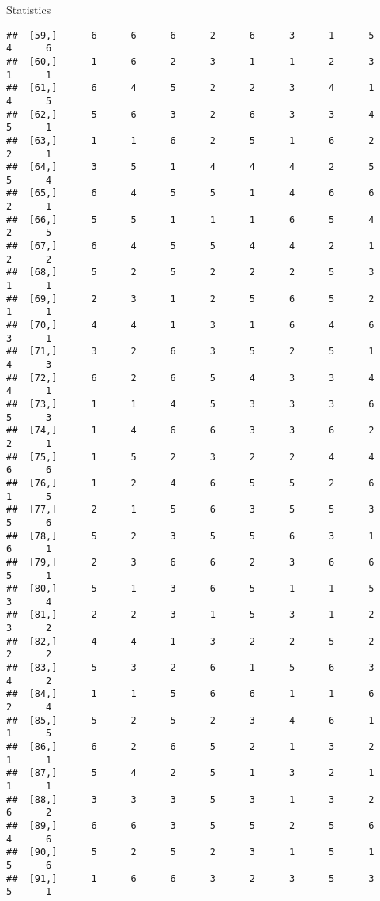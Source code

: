 \documentclass[
  ignorenonframetext,
]{beamer}
\begin{document}
\begin{frame}[fragile]{Statistics}
\begin{verbatim}
##  [59,]      6      6      6      2      6      3      1      5      4      6
##  [60,]      1      6      2      3      1      1      2      3      1      1
##  [61,]      6      4      5      2      2      3      4      1      4      5
##  [62,]      5      6      3      2      6      3      3      4      5      1
##  [63,]      1      1      6      2      5      1      6      2      2      1
##  [64,]      3      5      1      4      4      4      2      5      5      4
##  [65,]      6      4      5      5      1      4      6      6      2      1
##  [66,]      5      5      1      1      1      6      5      4      2      5
##  [67,]      6      4      5      5      4      4      2      1      2      2
##  [68,]      5      2      5      2      2      2      5      3      1      1
##  [69,]      2      3      1      2      5      6      5      2      1      1
##  [70,]      4      4      1      3      1      6      4      6      3      1
##  [71,]      3      2      6      3      5      2      5      1      4      3
##  [72,]      6      2      6      5      4      3      3      4      4      1
##  [73,]      1      1      4      5      3      3      3      6      5      3
##  [74,]      1      4      6      6      3      3      6      2      2      1
##  [75,]      1      5      2      3      2      2      4      4      6      6
##  [76,]      1      2      4      6      5      5      2      6      1      5
##  [77,]      2      1      5      6      3      5      5      3      5      6
##  [78,]      5      2      3      5      5      6      3      1      6      1
##  [79,]      2      3      6      6      2      3      6      6      5      1
##  [80,]      5      1      3      6      5      1      1      5      3      4
##  [81,]      2      2      3      1      5      3      1      2      3      2
##  [82,]      4      4      1      3      2      2      5      2      2      2
##  [83,]      5      3      2      6      1      5      6      3      4      2
##  [84,]      1      1      5      6      6      1      1      6      2      4
##  [85,]      5      2      5      2      3      4      6      1      1      5
##  [86,]      6      2      6      5      2      1      3      2      1      1
##  [87,]      5      4      2      5      1      3      2      1      1      1
##  [88,]      3      3      3      5      3      1      3      2      6      2
##  [89,]      6      6      3      5      5      2      5      6      4      6
##  [90,]      5      2      5      2      3      1      5      1      5      6
##  [91,]      1      6      6      3      2      3      5      3      5      1

\end{verbatim}
\end{frame}
\end{document}
